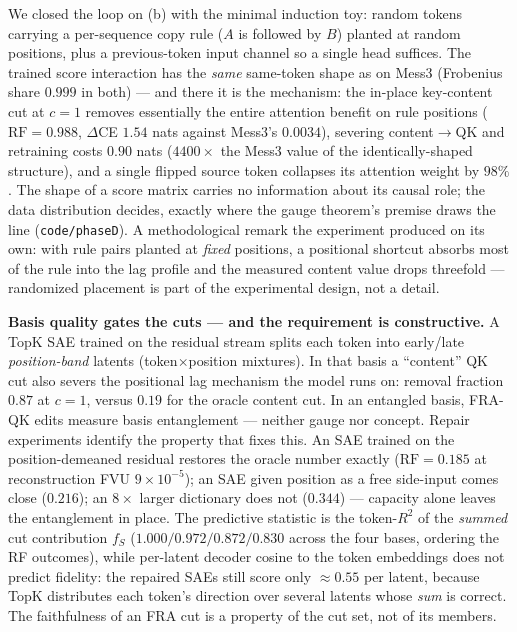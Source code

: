 \documentclass{article}
\newcommand{\RF}{\mathrm{RF}}
\theoremstyle{definition}
\begin{document}
We closed the loop on (b) with the minimal induction toy: random tokens
carrying a per-sequence copy rule ($A$ is followed by $B$) planted at
random positions, plus a
previous-token input channel so a single head suffices. The trained score
interaction has the \emph{same} same-token shape as on Mess3 (Frobenius
share $0.999$ in both) --- and there it is the mechanism: the in-place
key-content cut at $c=1$ removes essentially the entire attention benefit
on rule positions ($\RF = 0.988$, $\Delta$CE $1.54$ nats against Mess3's
$0.0034$), severing content$\to$QK and retraining costs $0.90$ nats
($4400\times$ the Mess3 value of the identically-shaped structure), and a
single flipped source token collapses its attention weight by $98\%$.
The shape of a score matrix carries no information about its causal role;
the data distribution decides, exactly where the gauge theorem's premise
draws the line (\texttt{code/phaseD}). A methodological remark the
experiment produced on its own: with rule pairs planted at \emph{fixed}
positions, a positional shortcut absorbs most of the rule into the lag
profile and the measured content value drops threefold --- randomized
placement is part of the experimental design, not a detail.

\textbf{Basis quality gates the cuts --- and the requirement is
constructive.} A TopK SAE trained on the residual
stream splits each token into early/late \emph{position-band} latents
(token$\times$position mixtures). In that basis a ``content'' QK cut also
severs the positional lag mechanism the model runs on: removal fraction
$0.87$ at $c = 1$, versus $0.19$ for the oracle content cut. In an
entangled basis, FRA-QK edits measure basis entanglement --- neither gauge
nor concept. Repair experiments identify the property that fixes this. An
SAE trained on the position-demeaned residual restores the oracle number
exactly ($\RF = 0.185$ at reconstruction FVU $9\times10^{-5}$); an SAE
given position as a free side-input comes close ($0.216$); an $8\times$
larger dictionary does not ($0.344$) --- capacity alone leaves the
entanglement in place. The predictive statistic is the token-$R^2$ of the
\emph{summed} cut contribution $f_S$ ($1.000 / 0.972 / 0.872 / 0.830$
across the four bases, ordering the RF outcomes), while per-latent decoder
cosine to the token embeddings does not predict fidelity: the repaired
SAEs still score only $\approx 0.55$ per latent, because TopK distributes
each token's direction over several latents whose \emph{sum} is correct.
The faithfulness of an FRA cut is a property of the cut set, not of its
members.
\end{document}
